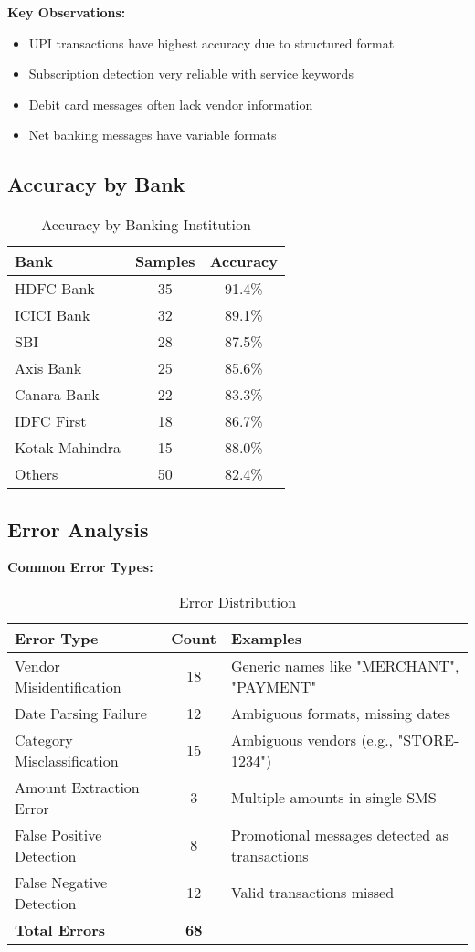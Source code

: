 \documentclass[11pt,a4paper]{report}
\begin{document}
\begin{itemize}
\begin{itemize}
\textbf{Key Observations:}
\begin{itemize}
    \item UPI transactions have highest accuracy due to structured format
    \item Subscription detection very reliable with service keywords
    \item Debit card messages often lack vendor information
    \item Net banking messages have variable formats
\end{itemize}

\subsection{Accuracy by Bank}

\begin{table}[H]
\centering
\caption{Accuracy by Banking Institution}
\begin{tabular}{|l|c|c|}
\hline
\textbf{Bank} & \textbf{Samples} & \textbf{Accuracy} \\
\hline
HDFC Bank & 35 & 91.4\% \\
ICICI Bank & 32 & 89.1\% \\
SBI & 28 & 87.5\% \\
Axis Bank & 25 & 85.6\% \\
Canara Bank & 22 & 83.3\% \\
IDFC First & 18 & 86.7\% \\
Kotak Mahindra & 15 & 88.0\% \\
Others & 50 & 82.4\% \\
\hline
\end{tabular}
\end{table}

\subsection{Error Analysis}

\textbf{Common Error Types:}

\begin{table}[H]
\centering
\caption{Error Distribution}
\begin{tabular}{|l|c|p{6cm}|}
\hline
\textbf{Error Type} & \textbf{Count} & \textbf{Examples} \\
\hline
Vendor Misidentification & 18 & Generic names like "MERCHANT", "PAYMENT" \\
Date Parsing Failure & 12 & Ambiguous formats, missing dates \\
Category Misclassification & 15 & Ambiguous vendors (e.g., "STORE-1234") \\
Amount Extraction Error & 3 & Multiple amounts in single SMS \\
False Positive Detection & 8 & Promotional messages detected as transactions \\
False Negative Detection & 12 & Valid transactions missed \\
\hline
\textbf{Total Errors} & \textbf{68} & \\
\hline
\end{tabular}
\end{table}


\end{itemize}
\end{itemize}
\end{document}
